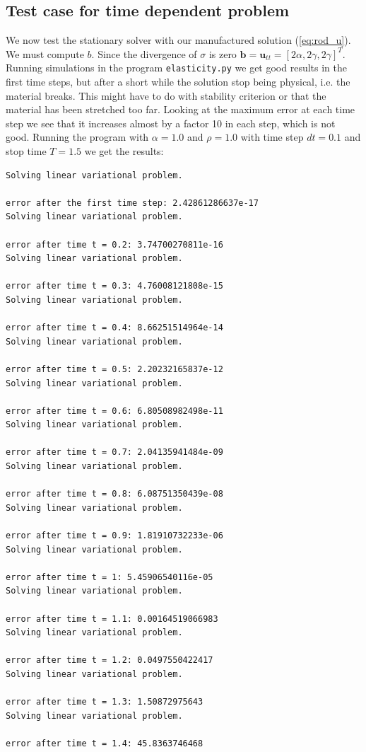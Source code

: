 \documentclass[twoside]{article}
\begin{document}
\subsection{Test case for time dependent problem}
We now test the stationary solver with our manufactured solution (\ref{eq:rod_u}). We must compute \( b\). Since the divergence of \( \sigma\) is zero \( \mathbf{b} = \mathbf{u}_{tt} = [2\alpha, 2\gamma, 2 \gamma]^T \).
Running simulations in the program \texttt{elasticity.py} we get good results in the first time steps, but after a short while the solution stop being physical, i.e. the material breaks. This might have to do with stability criterion or that the material has been stretched too far. Looking at the maximum error at each time step we see that it increases almost by a factor 10 in each step, which is not good. Running the program with \( \alpha = 1.0\) and \( \rho = 1.0\) with time step \( dt = 0.1\) and stop time \( T = 1.5\) we get the results:
\begin{lstlisting}
Solving linear variational problem.

error after the first time step: 2.42861286637e-17
Solving linear variational problem.

error after time t = 0.2: 3.74700270811e-16
Solving linear variational problem.

error after time t = 0.3: 4.76008121808e-15
Solving linear variational problem.

error after time t = 0.4: 8.66251514964e-14
Solving linear variational problem.

error after time t = 0.5: 2.20232165837e-12
Solving linear variational problem.

error after time t = 0.6: 6.80508982498e-11
Solving linear variational problem.

error after time t = 0.7: 2.04135941484e-09
Solving linear variational problem.

error after time t = 0.8: 6.08751350439e-08
Solving linear variational problem.

error after time t = 0.9: 1.81910732233e-06
Solving linear variational problem.

error after time t = 1: 5.45906540116e-05
Solving linear variational problem.

error after time t = 1.1: 0.00164519066983
Solving linear variational problem.

error after time t = 1.2: 0.0497550422417
Solving linear variational problem.

error after time t = 1.3: 1.50872975643
Solving linear variational problem.

error after time t = 1.4: 45.8363746468
\end{lstlisting}
\end{document}
